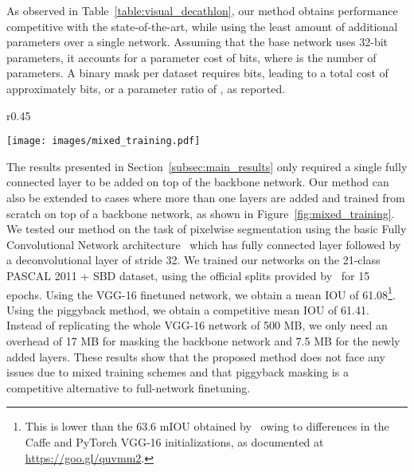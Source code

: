 \documentclass{llncs}
\begin{document}
As observed in Table~\ref{table:visual_decathlon}, our method obtains performance competitive with the state-of-the-art, while using the least amount of additional parameters over a single network. Assuming that the base network uses 32-bit parameters, it accounts for a parameter cost of  bits, where  is the number of parameters. A binary mask per dataset requires  bits, leading to a total cost of approximately  bits, or a parameter ratio of , as reported.

\begin{wrapfigure}{r}{0.45\textwidth}
  \begin{center}
    \texttt{[image: images/mixed\_training.pdf]}
  \end{center}
  \caption{Mixed training of layers using finetuning from scratch and piggyback masking.}
  \label{fig:mixed_training}
\end{wrapfigure}
The results presented in Section~\ref{subsec:main_results} only required a single fully connected layer to be added on top of the backbone network. Our method can also be extended to cases where more than one layers are added and trained from scratch on top of a backbone network, as shown in Figure~\ref{fig:mixed_training}.
We tested our method on the task of pixelwise segmentation using the basic Fully Convolutional Network architecture~\cite{long2015fully} which has fully connected layer followed by a deconvolutional layer of stride 32. 
We trained our networks on the 21-class PASCAL 2011 + SBD dataset, using the official splits provided by~\cite{SegmentationSplits} for 15 epochs.
Using the VGG-16 finetuned network, we obtain a mean IOU of 61.08\footnote{This is  lower than the 63.6 mIOU obtained by~\cite{long2015fully} owing to differences in the Caffe and PyTorch VGG-16 initializations, as documented at \url{https://goo.gl/quvmm2}.}.
Using the piggyback method, we obtain a competitive mean IOU of 61.41. 
Instead of replicating the whole VGG-16 network of 500 MB, we only need an overhead of 17 MB for masking the backbone network and 7.5 MB for the newly added layers.
These results show that the proposed method does not face any issues due to mixed training schemes and that piggyback masking is a competitive alternative to full-network finetuning.










 
\end{document}
